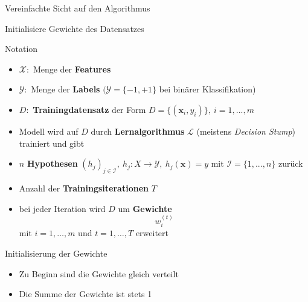 \documentclass[hyperref={bookmarks=false},11pt,dvipsnames]{beamer}
\begin{document}
\begin{frame}{Vereinfachte Sicht auf den Algorithmus}
	\begin{algorithm}[H]
		\DontPrintSemicolon
		\LinesNotNumbered
		\BlankLine
		Initialisiere Gewichte des Datensatzes\;
	\end{algorithm}
\end{frame}

\begin{frame}[t]{Notation}
	\begin{itemize}
		\item <1-> $\mathcal{X}:$ Menge der \textbf{Features}
		\item <2-> $\mathcal{Y}:$ Menge der \textbf{Labels} $(\mathcal{Y}=\{-1,+1\}$ bei binärer Klassifikation)
		\item <3-> $D:$ \textbf{Trainingdatensatz} der Form $D=\{(\boldsymbol{x}_i,y_i)\},~i=1,...,m$
		\item <4-> Modell wird auf $D$ durch \textbf{Lernalgorithmus} $\mathcal{L}$ (meistens \emph{Decision Stump}) trainiert und gibt
		\item <5-> $n$ \textbf{Hypothesen} $(h_j)_{j\in\mathcal{I}},~h_j:X\rightarrow\mathcal{Y},~h_j(\boldsymbol{x})=y$ mit $\mathcal{I}=\{1,...,n\}$ zurück
		\item <6-> Anzahl der \textbf{Trainingsiterationen} $T$
		\item <7-> bei jeder Iteration wird $D$ um \textbf{Gewichte} $$w^{(t)}_i$$ mit $i=1,\dots,m$ und $t=1,\dots,T$ erweitert
	\end{itemize}
\end{frame}

\begin{frame}[t]{Initialisierung der Gewichte}
	\begin{itemize}
		\item <1-> Zu Beginn sind die Gewichte gleich verteilt 
		\item <2-> Die Summe der Gewichte ist stets 1 
	\end{itemize}
\end{frame}
\end{document}
